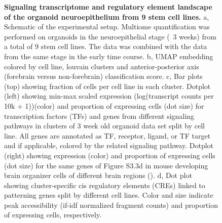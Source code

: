 \begin{figure}[t!]
    \centering
    \caption{\textbf{Signaling transcriptome and regulatory element landscape of the organoid neuroepithelium from 9 stem cell lines.} a, Schematic of the experimental setup. Multiome quantification was performed on organoids in the neuroepithelial stage (~3 weeks) from a total of 9 stem cell lines. The data was combined with the data from the same stage in the early time course. b, UMAP embedding colored by cell line, louvain clusters and anterior-posterior axis (forebrain versus non-forebrain) classification score. c, Bar plots (top) showing fraction of cells per cell line in each cluster. Dotplot (left) showing min-max scaled expression (log(transcript counts per 10k + 1))(color) and proportion of expressing cells (dot size) for transcription factors (TFs) and genes from different signaling pathways in clusters of 3 week old organoid data set split by cell line. All genes are annotated as TF, receptor, ligand, or TF target and if applicable, colored by the related signaling pathway. Dotplot (right) showing expression (color) and proportion of expressing cells (dot size) for the same genes of Figure S3.3d in mouse developing brain organizer cells of different brain regions (\cite{la_manno_molecular_2021}). d, Dot plot showing cluster-specific cis regulatory elements (CREs) linked to patterning genes split by different cell lines. Color and size indicate peak accessibility (if-idf normalized fragment counts) and proportion of expressing cells, respectively.}
\end{figure}

\clearpage

